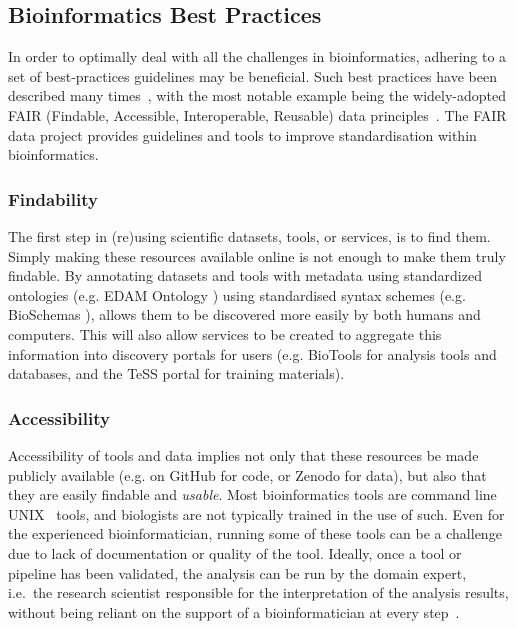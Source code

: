 \begin{justify}
\section{Bioinformatics Best Practices}

In order to optimally deal with all the challenges in bioinformatics, adhering to a set of best-practices guidelines may be beneficial. Such best practices have been described many times~\cite{sandve2013ten,Seemann2013,wilson2014best,prlic2012ten,altschul2013anatomy,via2013best,Leprevost2014}, with the most notable example being the widely-adopted FAIR (Findable, Accessible, Interoperable, Reusable) data principles~\cite{wilkinson2016fair}. The FAIR data project provides guidelines and tools to improve standardisation within bioinformatics.

\subsubsection{Findability}
The first step in (re)using scientific datasets, tools, or services, is to find them. Simply making these resources available online is not enough to make them truly findable. By annotating datasets and tools with metadata using standardized ontologies (e.g. EDAM Ontology \cite{ison2013edam}) using standardised syntax schemes (e.g. BioSchemas \cite{gray2017bioschemas}), allows them to be discovered more easily by both humans and computers. This will also allow services to be created to aggregate this information into discovery portals for users (e.g. BioTools \cite{url-biotools} for analysis tools and databases, and the TeSS portal \cite{url-tess} for training materials).


\subsubsection{Accessibility}
Accessibility of tools and data implies not only that these resources be made publicly available (e.g. on GitHub for code, or Zenodo for data), but also that they are easily findable and \emph{usable}. Most bioinformatics tools are command line UNIX~\cite{url-unix} tools, and biologists are not typically trained in the use of such. Even for the experienced bioinformatician, running some of these tools can be a challenge due to lack of documentation or quality of the tool. Ideally, once a tool or pipeline has been validated, the analysis can be run by the domain expert, i.e.\ the research scientist responsible for the interpretation of the analysis results, without being reliant on the support of a bioinformatician at every step~\cite{kumar2007bioinformatics}.


\end{justify}
